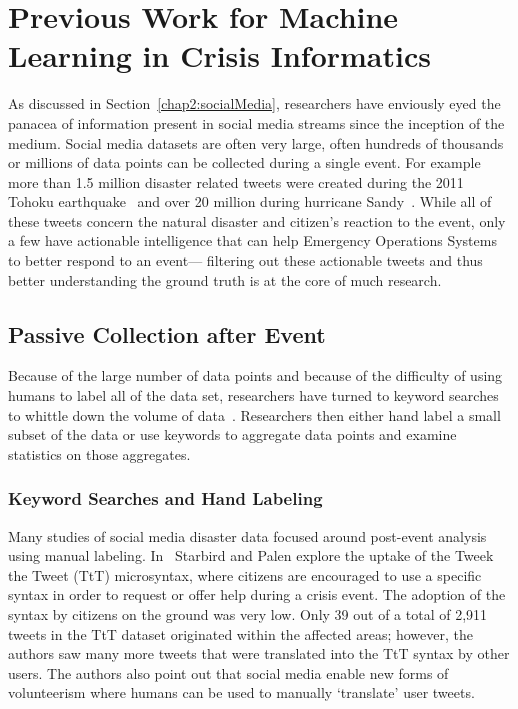 \chapter{Previous Work for Machine Learning in Crisis Informatics}

As discussed in Section~\ref{chap2:socialMedia}, researchers have enviously eyed
the panacea of information present in social media streams since the inception
of the medium. Social media datasets are often very large, often hundreds of
thousands or millions of data points can be collected during a single event. For
example more than 1.5 million disaster related tweets were created during the
2011 Tohoku earthquake~\cite{doanAnalysisTwitterMessages2012} and over 20
million during hurricane Sandy~\cite{meierDigitalHumanitariansHow2015}. While
all of these tweets concern the natural disaster and citizen's reaction to the
event, only a few have actionable intelligence that can help Emergency
Operations Systems to better respond to an event--- filtering out these 
actionable tweets and thus better understanding the ground truth is at the core 
of much research. 

\section{Passive Collection after Event}
Because of the large number of data points and because of the difficulty of
using humans to label all of the data set, researchers have turned to keyword
searches to whittle down the volume of
data~\cite{doanAnalysisTwitterMessages2012}. Researchers then either hand label
a small subset of the data or use keywords to aggregate data points and examine
statistics on those aggregates.

\subsection{Keyword Searches and Hand Labeling}
Many studies of social media disaster data focused around post-event analysis
using manual labeling. In~\cite{starbirdVoluntweetersSelforganizingDigital}
Starbird and Palen explore the uptake of the Tweek the Tweet (TtT) microsyntax, where
citizens are encouraged to use a specific syntax in order to request or offer
help during a crisis event. The adoption of the syntax by citizens on the ground
was very low. Only 39 out of a total of 2,911 tweets in the TtT dataset originated within the affected
areas; however, the authors saw many more tweets that were translated into the
TtT syntax by other users. The authors also point out that social media enable new
forms of volunteerism where humans can be used to manually `translate' user tweets.

